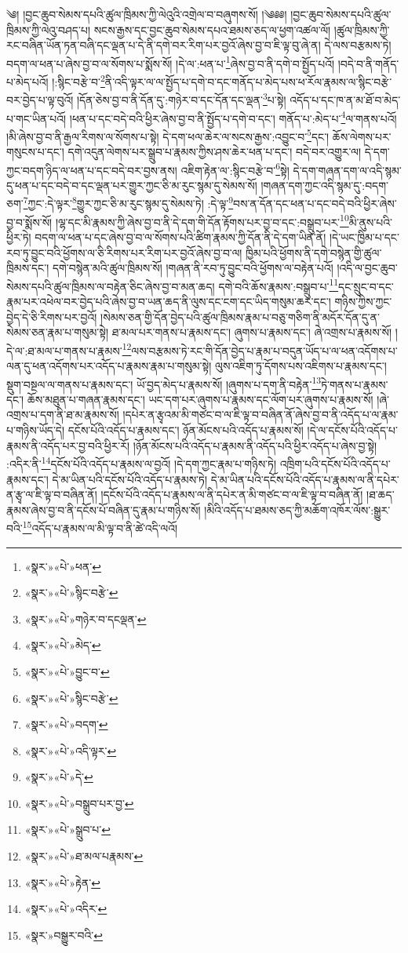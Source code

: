 ༄། །བྱང་ཆུབ་སེམས་དཔའི་ཚུལ་ཁྲིམས་ཀྱི་ལེའུའི་འགྲེལ་བ་བཞུགས་སོ། །༄༅༅། །བྱང་ཆུབ་སེམས་དཔའི་ཚུལ་ཁྲིམས་ཀྱི་ལེའུ་བཤད་པ། སངས་རྒྱས་དང་བྱང་ཆུབ་སེམས་དཔའ་ཐམས་ཅད་ལ་ཕྱག་འཚལ་ལོ། །ཚུལ་ཁྲིམས་ཀྱི་རང་བཞིན་ཡོན་ཏན་བཞི་དང་ལྡན་པ་དེ་ནི་དགེ་བར་རིག་པར་བྱའོ་ཞེས་བྱ་བ་ཇི་ལྟ་བུ་ཞེ་ན། དེ་ལས་བརྩམས་ཏེ། བདག་ལ་ཕན་པ་ཞེས་བྱ་བ་ལ་སོགས་པ་སྨོས་སོ། །དེ་ལ་:ཕན་པ་\footnote{«སྣར་»«པེ་»ཕན་}ཞེས་བྱ་བ་ནི་དགེ་བ་སྤྱོད་པའོ། །བདེ་བ་ནི་གནོད་པ་མེད་པའོ། །:སྙིང་བརྩེ་བ་\footnote{«སྣར་»«པེ་»སྙིང་བརྩེ་}ནི་འདི་ལྟར་ལ་ལ་སྤྱོད་པ་དགེ་བ་དང་གནོད་པ་མེད་པས་ཕ་རོལ་རྣམས་ལ་སྙིང་བརྩེ་བར་བྱེད་པ་ལྟ་བུའོ། །དོན་ཅེས་བྱ་བ་ནི་དོན་དུ་:གཉེར་བ་དང་དོན་དང་ལྡན་\footnote{«སྣར་»«པེ་»གཉེར་བ་དངལྡན་}པ་སྟེ། འདོད་པ་དང་ཁ་ན་མ་ཐོ་བ་མེད་པ་གང་ཡིན་པའོ། །ཕན་པ་དང་བདེ་བའི་ཕྱིར་ཞེས་བྱ་བ་ནི་སྤྱོད་པ་དགེ་བ་དང་། གནོད་པ་:མེད་པ་\footnote{«སྣར་»«པེ་»མེད་}ལ་གནས་པའོ། །མི་ཞེས་བྱ་བ་ནི་རྒྱལ་རིགས་ལ་སོགས་པ་སྟེ། དེ་དག་ཕལ་ཆེར་ལ་སངས་རྒྱས་:འབྱུང་བ་\footnote{«སྣར་»«པེ་»བྱུང་བ་}དང་། ཆོས་ལེགས་པར་གསུངས་པ་དང་། དགེ་འདུན་ལེགས་པར་སྒྲུབ་པ་རྣམས་ཀྱིས་ཤས་ཆེར་ཕན་པ་དང་། བདེ་བར་འགྱུར་ལ། དེ་དག་ཀྱང་བདག་ཉིད་ལ་ཕན་པ་དང་བདེ་བར་བྱས་ནས། འཇིག་རྟེན་ལ་:སྙིང་བརྩེ་བ་\footnote{«སྣར་»«པེ་»སྙིང་བརྩེ་}སྟེ། དེ་དག་གཞན་དག་ལ་འདི་སྙམ་དུ་ཕན་པ་དང་བདེ་བ་དང་ལྡན་པར་གྱུར་ཀྱང་ཅི་མ་རུང་སྙམ་དུ་སེམས་སོ། །གཞན་དག་ཀྱང་འདི་སྙམ་དུ་:བདག་ཅག་\footnote{«སྣར་»«པེ་»བདག་}ཀྱང་:དེ་ལྟར་\footnote{«སྣར་»«པེ་»འདི་ལྟར་}གྱུར་ཀྱང་ཅི་མ་རུང་སྙམ་དུ་སེམས་ཏེ། :དེ་ལྟ་\footnote{«སྣར་»«པེ་»དེ་}བས་ན་དོན་དང་ཕན་པ་དང་བདེ་བའི་ཕྱིར་ཞེས་བྱ་བ་སྨོས་སོ། །ལྷ་དང་མི་རྣམས་ཀྱི་ཞེས་བྱ་བ་ནི་དེ་དག་གི་དོན་རྟོགས་པར་བྱ་བ་དང་:བསྒྲུབ་པར་\footnote{«སྣར་»«པེ་»བསྒྲུབ་པར་བྱ་}མི་ནུས་པའི་ཕྱིར་ཏེ། བདག་ལ་ཕན་པ་དང་ཞེས་བྱ་བ་ལ་སོགས་པའི་ཚིག་རྣམས་ཀྱི་དོན་ནི་དེ་དག་ཡིན་ནོ། །དེ་ཡང་ཁྱིམ་པ་དང་རབ་ཏུ་བྱུང་བའི་ཕྱོགས་ལ་ཅི་རིགས་པར་རིག་པར་བྱའོ་ཞེས་བྱ་བ་ལ། ཁྱིམ་པའི་ཕྱོགས་ནི་དགེ་བསྙེན་གྱི་ཚུལ་ཁྲིམས་དང་། དགེ་བསྙེན་མའི་ཚུལ་ཁྲིམས་སོ། །གཞན་ནི་རབ་ཏུ་བྱུང་བའི་ཕྱོགས་ལ་བརྟེན་པའོ། །འདི་ལ་བྱང་ཆུབ་སེམས་དཔའི་ཚུལ་ཁྲིམས་ལ་བརྟེན་ཅིང་ཞེས་བྱ་བ་མན་ཆད། དགེ་བའི་ཆོས་རྣམས་:བསྒྲུབ་པ་\footnote{«སྣར་»«པེ་»སྒྲུབ་པ་}དང་སྲུང་བ་དང་རྣམ་པར་འཕེལ་བར་བྱེད་པའི་ཞེས་བྱ་བ་ཡན་ཆད་ནི་ལུས་དང་ངག་དང་ཡིད་གསུམ་ཆར་དང་། གཉིས་ཀྱིས་ཀྱང་བྱེད་དེ་ཅི་རིགས་པར་བྱའོ། །སེམས་ཅན་གྱི་དོན་བྱེད་པའི་ཚུལ་ཁྲིམས་རྣམ་པ་བཅུ་གཅིག་ནི་མདོར་དོན་དུ་ན་སེམས་ཅན་རྣམ་པ་གསུམ་སྟེ། ཐ་མལ་པར་གནས་པ་རྣམས་དང་། ཞུགས་པ་རྣམས་དང་། ཞེ་འགྲས་པ་རྣམས་སོ། །དེ་ལ་:ཐ་མལ་པ་གནས་པ་རྣམས་\footnote{«སྣར་»«པེ་»ཐ་མལ་པརྣམས་}ལས་བརྩམས་ཏེ་རང་གི་དོན་བྱེད་པ་རྣམ་པ་བདུན་ཡོད་པ་ལ་ཕན་འདོགས་པ་ལན་དུ་ཕན་འདོགས་པར་འདོད་པ་རྣམས་རྣམ་པ་གསུམ་སྟེ། ལུས་འཇིག་ཏུ་དོགས་པས་འཇིགས་པ་རྣམས་དང་། སྡུག་བསྔལ་ལ་གནས་པ་རྣམས་དང་། ཡོ་བྱད་མེད་པ་རྣམས་སོ། །ཞུགས་པ་དག་ནི་བརྟེན་\footnote{«སྣར་»«པེ་»རྟེན་}ཏེ་གནས་པ་རྣམས་དང་། ཆོས་མཐུན་པ་གཞན་རྣམས་དང་། ཡང་དག་པར་ཞུགས་པ་རྣམས་དང་ལོག་པར་ཞུགས་པ་རྣམས་སོ། །ཞེ་འགྲས་པ་དག་ནི་ཐ་མ་རྣམས་སོ། །དཔེར་ན་རྩྭའམ་མི་གཙང་བ་ལ་ཇི་ལྟ་བ་བཞིན་ནོ་ཞེས་བྱ་བ་ནི་འདོད་པ་ལ་རྣམ་པ་གཉིས་ཡོད་དེ། དངོས་པོའི་འདོད་པ་རྣམས་དང་། ཉོན་མོངས་པའི་འདོད་པ་རྣམས་སོ། །དེ་ལ་དངོས་པོའི་འདོད་པ་རྣམས་ནི་འདོད་པར་བྱ་བའི་ཕྱིར་རོ། །ཉོན་མོངས་པའི་འདོད་པ་རྣམས་ནི་འདོད་པའི་ཕྱིར་འདོད་པ་ཞེས་བྱ་སྟེ། :འདིར་ནི་\footnote{«སྣར་»«པེ་»འདིར་}དངོས་པོའི་འདོད་པ་རྣམས་ལ་བྱའོ། །དེ་དག་ཀྱང་རྣམ་པ་གཉིས་ཏེ། འཁྲིག་པའི་དངོས་པོའི་འདོད་པ་རྣམས་དང་། དེ་མ་ཡིན་པའི་དངོས་པོའི་འདོད་པ་རྣམས་ཏེ། དེ་མ་ཡིན་པའི་དངོས་པོའི་འདོད་པ་རྣམས་ལ་ནི་དཔེར་ན་རྩྭ་ལ་ཇི་ལྟ་བ་བཞིན་ནོ། །དངོས་པོའི་འདོད་པ་རྣམས་ལ་ནི་དཔེར་ན་མི་གཙང་བ་ལ་ཇི་ལྟ་བ་བཞིན་ནོ། །ཐ་ཆད་རྣམས་ཞེས་བྱ་བ་ནི་དངོས་པོ་བཞིན་དུ་རྣམ་པ་གཉིས་སོ། །མིའི་འདོད་པ་ཐམས་ཅད་ཀྱི་མཆོག་འཁོར་ལོས་:སྒྱུར་བའི་\footnote{«སྣར་»བསྒྱུར་བའི་}འདོད་པ་རྣམས་ལ་མི་ལྟ་བ་ནི་ཚེ་འདི་ལའོ། 